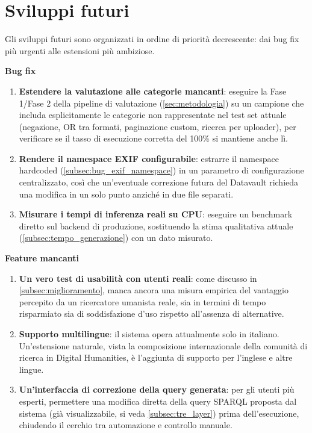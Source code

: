 \section{Sviluppi futuri}\label{sec:sviluppi_futuri}

Gli sviluppi futuri sono organizzati in ordine di priorità decrescente: dai bug fix più urgenti alle estensioni più ambiziose.

\textbf{Bug fix}\label{subsec:bugfix}

\begin{enumerate}
    \item \textbf{Estendere la valutazione alle categorie mancanti}: eseguire la Fase 1/Fase 2 della pipeline di valutazione (\cref{sec:metodologia}) su un campione che includa esplicitamente le categorie non rappresentate nel test set attuale (negazione, OR tra formati, paginazione custom, ricerca per uploader), per verificare se il tasso di esecuzione corretta del 100\% si mantiene anche lì.
    \item \textbf{Rendere il namespace EXIF configurabile}: estrarre il namespace hardcoded (\cref{subsec:bug_exif_namespace}) in un parametro di configurazione centralizzato, così che un'eventuale correzione futura del Datavault richieda una modifica in un solo punto anziché in due file separati.
    \item \textbf{Misurare i tempi di inferenza reali su CPU}: eseguire un benchmark diretto sul backend di produzione, sostituendo la stima qualitativa attuale (\cref{subsec:tempo_generazione}) con un dato misurato.
\end{enumerate}

\textbf{Feature mancanti}\label{subsec:feature_mancanti}

\begin{enumerate}
    \item \textbf{Un vero test di usabilità con utenti reali}: come discusso in \cref{subsec:miglioramento}, manca ancora una misura empirica del vantaggio percepito da un ricercatore umanista reale, sia in termini di tempo risparmiato sia di soddisfazione d'uso rispetto all'assenza di alternative.
    \item \textbf{Supporto multilingue}: il sistema opera attualmente solo in italiano. Un'estensione naturale, vista la composizione internazionale della comunità di ricerca in Digital Humanities, è l'aggiunta di supporto per l'inglese e altre lingue.
    \item \textbf{Un'interfaccia di correzione della query generata}: per gli utenti più esperti, permettere una modifica diretta della query SPARQL proposta dal sistema (già visualizzabile, si veda \cref{subsec:tre_layer}) prima dell'esecuzione, chiudendo il cerchio tra automazione e controllo manuale.
\end{enumerate}

